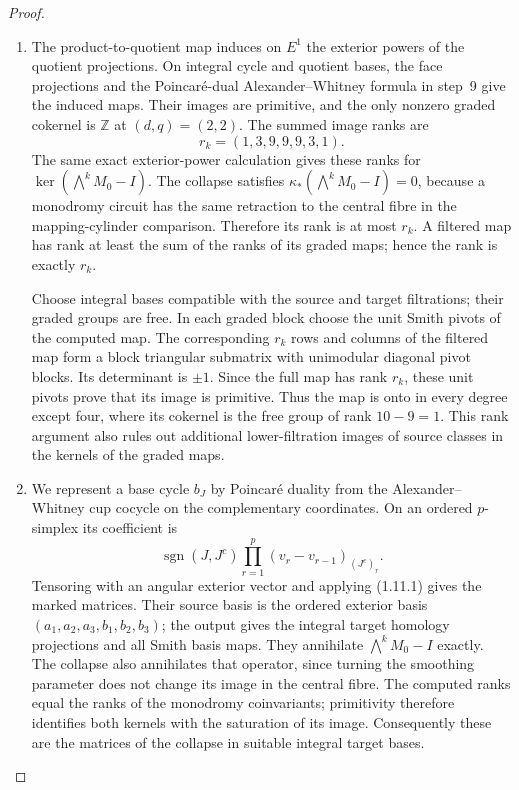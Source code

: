 \begin{proof}
\begin{enumerate}[label={$\langle1\rangle$\arabic*.}]
\item The product-to-quotient map induces on $E^1$ the exterior powers of
the quotient projections.  On integral cycle and quotient bases, the face projections and the
Poincar\'e-dual Alexander--Whitney formula in step~9 give the induced maps. Their images are primitive, and the only nonzero graded cokernel
is $\mathbb Z$ at $(d,q)=(2,2)$.  The summed image ranks are
\[
             r_k=(1,3,9,9,9,3,1).
\]
The same exact exterior-power calculation gives these ranks for
$\ker(\bigwedge^kM_0-I)$.
The collapse satisfies
$\kappa_*(\bigwedge^kM_0-I)=0$, because a monodromy circuit
has the same retraction to the central fibre in the mapping-cylinder
comparison.  Therefore its rank is at most $r_k$.
A filtered map has rank at least the sum of the ranks of its
graded maps; hence the rank is exactly $r_k$.

Choose integral bases compatible with the source and target
filtrations; their graded groups are free.  In each graded block
choose the unit Smith pivots of the computed map.  The corresponding
$r_k$ rows and columns of the filtered map form a block
triangular submatrix with unimodular diagonal pivot blocks.
Its determinant is $\pm1$.  Since the full map has rank $r_k$,
these unit pivots prove that its image is primitive.
Thus the map is onto in every degree except four, where its
cokernel is the free group of rank $10-9=1$.
This rank argument also rules out additional lower-filtration images
of source classes in the kernels of the graded maps.

\item We represent a base cycle $b_J$ by
Poincar\'e duality from the Alexander--Whitney cup cocycle on the
complementary coordinates.  On an ordered $p$-simplex its coefficient
is
\[
\operatorname{sgn}(J,J^c)
 \prod_{r=1}^p(v_r-v_{r-1})_{(J^c)_r}.
\]
Tensoring with an angular exterior vector and applying (1.11.1)
gives the marked matrices. Their source basis is the ordered exterior
basis $(a_1,a_2,a_3,b_1,b_2,b_3)$; the output gives the integral
target homology projections and all Smith basis maps.
They annihilate $\bigwedge^kM_0-I$ exactly.  The collapse also
annihilates that operator, since turning the smoothing parameter
does not change its image in the central fibre.  The computed ranks
equal the ranks of the monodromy coinvariants; primitivity therefore
identifies both kernels with the saturation of its image.
Consequently these are the matrices of the collapse in suitable integral target bases.


\end{enumerate}
\end{proof}
